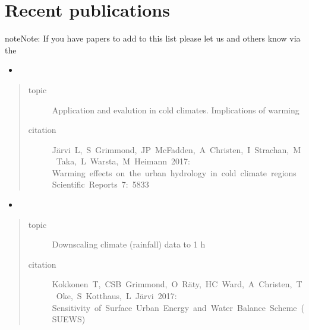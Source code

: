\documentclass[letterpaper,10pt,english]{sphinxmanual}
\begin{document}
\chapter{Recent publications}
\label{\detokenize{recent-publications:recent-publications}}\label{\detokenize{recent-publications:index-page}}\label{\detokenize{recent-publications::doc}}\label{\detokenize{recent-publications:suews-surface-urban-energy-and-water-balance-scheme}}
\begin{sphinxadmonition}{note}{Note:}
If you have papers to add to this list please let us and others know
via the 
\end{sphinxadmonition}
\begin{itemize}
\item {} 

\end{itemize}
\begin{quote}\begin{description}
\item[{topic}] \leavevmode
Application and evalution in cold climates. Implications of warming

\item[{citation}] \leavevmode
Järvi L, S Grimmond, JP McFadden, A Christen, I Strachan, M Taka, L Warsta, M Heimann 2017:
Warming effects on the urban hydrology in cold climate regions
Scientific Reports 7: 5833

\end{description}\end{quote}
\begin{itemize}
\item {} 

\end{itemize}
\begin{quote}\begin{description}
\item[{topic}] \leavevmode
Downscaling climate (rainfall) data to 1 h

\item[{citation}] \leavevmode
Kokkonen T, CSB Grimmond, O Räty, HC Ward, A Christen, T Oke, S Kotthaus, L Järvi 2017:
Sensitivity of Surface Urban Energy and Water Balance Scheme (SUEWS)

\end{description}\end{quote}
\end{document}
